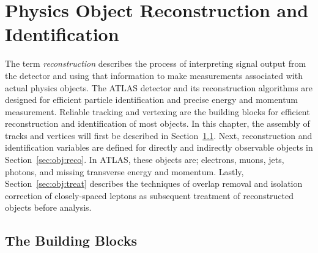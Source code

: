 \chapter{Physics Object Reconstruction and Identification}
\label{ch:obj}
The term \textit{reconstruction} describes the process of interpreting signal output from the detector and using that information to make measurements associated with actual physics objects.  The ATLAS detector and its reconstruction algorithms are designed for efficient particle identification and precise energy and momentum measurement.  Reliable tracking and vertexing are the building blocks for efficient reconstruction and identification of most objects.  In this chapter, the assembly of tracks and vertices will first be described in Section~\ref{sec:obj:bb}.  Next, reconstruction and identification variables are defined for directly and indirectly observable objects in Section~\ref{sec:obj:reco}.  In ATLAS, these objects are; electrons, muons, jets, photons, and missing transverse energy and momentum.  Lastly, Section~\ref{sec:obj:treat} describes the techniques of overlap removal and isolation correction of closely-spaced leptons as subsequent treatment of reconstructed objects before analysis.  

\section{The Building Blocks}
\label{sec:obj:bb}


